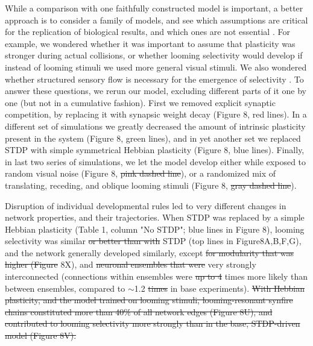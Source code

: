 \documentclass{article}
\providecommand{\DIFaddtex}[1]{{\protect\color{blue}{#1}}} %
\providecommand{\DIFdeltex}[1]{{\protect\color{red}\sout{#1}}}                      %
\providecommand{\DIFaddbegin}{} %
\providecommand{\DIFaddend}{} %
\providecommand{\DIFdelbegin}{} %
\providecommand{\DIFdelend}{} %
\providecommand{\DIFadd}[1]{\texorpdfstring{\DIFaddtex{#1}}{#1}} %
\providecommand{\DIFdel}[1]{\texorpdfstring{\DIFdeltex{#1}}{}} %
\newcommand{\DIFscaledelfig}{0.5}
\newlength{\DIFdelgraphicswidth} %
\newlength{\DIFdelgraphicsheight} %
\newcommand{\DIFaddincludegraphics}[2][]{{\color{blue}\fbox{\DIFOincludegraphics[#1]{#2}}}} %
\newcommand{\DIFdelincludegraphics}[2][]{%
\sbox{\DIFdelgraphicsbox}{\DIFOincludegraphics[#1]{#2}}%
\settoboxwidth{\DIFdelgraphicswidth}{\DIFdelgraphicsbox} %
\settoboxtotalheight{\DIFdelgraphicsheight}{\DIFdelgraphicsbox} %
\scalebox{\DIFscaledelfig}{%
\parbox[b]{\DIFdelgraphicswidth}{\usebox{\DIFdelgraphicsbox}\\[-\baselineskip] \rule{\DIFdelgraphicswidth}{0em}}\llap{\resizebox{\DIFdelgraphicswidth}{\DIFdelgraphicsheight}{%
\setlength{\unitlength}{\DIFdelgraphicswidth}%
\begin{picture}(1,1)%
\thicklines\linethickness{2pt} %
{\color[rgb]{1,0,0}\put(0,0){\framebox(1,1){}}}%
{\color[rgb]{1,0,0}\put(0,0){\line( 1,1){1}}}%
{\color[rgb]{1,0,0}\put(0,1){\line(1,-1){1}}}%
\end{picture}%
}\hspace*{3pt}}} %
} %
\DeclareRobustCommand{\DIFaddbegin}{\DIFOaddbegin \let\includegraphics\DIFaddincludegraphics} %
\DeclareRobustCommand{\DIFaddend}{\DIFOaddend \let\includegraphics\DIFOincludegraphics} %
\DeclareRobustCommand{\DIFdelbegin}{\DIFOdelbegin \let\includegraphics\DIFdelincludegraphics} %
\DeclareRobustCommand{\DIFdelend}{\DIFOaddend \let\includegraphics\DIFOincludegraphics} %
\begin{document}
While a comparison with one faithfully constructed model is important, a better approach is to consider a family of models, and see which assumptions are critical for the replication of biological results, and which ones are not essential \citep{linderman2017constrain, pauli2018repro}. For example, we wondered whether it was important to assume that plasticity was stronger during actual collisions, or whether looming selectivity would develop if instead of looming stimuli we used more general visual stimuli. We also wondered whether structured sensory flow is necessary for the emergence of selectivity \citep{triplett2018emergence}. To answer these questions, we rerun our model, excluding different parts of it one by one (but not in a cumulative fashion). First we removed explicit synaptic competition, by replacing it with synapsic weight decay (Figure 8, red lines). In a different set of simulations we greatly decreased the amount of intrinsic plasticity present in the system (Figure 8, \DIFaddbegin \DIFadd{dotted }\DIFaddend green lines), and in yet another set we replaced STDP with simple symmetrical Hebbian plasticity (Figure 8, blue lines). Finally, in last two series of simulations, we let the model develop either while exposed to random visual noise (Figure 8, \DIFdelbegin \DIFdel{pink dashed line}\DIFdelend \DIFaddbegin \DIFadd{dashed pink lines}\DIFaddend ), or a randomized mix of translating, receding, and oblique looming stimuli (Figure 8, \DIFdelbegin \DIFdel{gray dashed line}\DIFdelend \DIFaddbegin \DIFadd{dashed gray lines}\DIFaddend ).

Disruption of individual developmental rules led to very different changes in network properties, and their trajectories. When STDP was replaced by a simple Hebbian plasticity (Table 1, column "No STDP"; blue lines in Figure 8), looming selectivity was similar \DIFdelbegin \DIFdel{or better than with }\DIFdelend \DIFaddbegin \DIFadd{to that for }\DIFaddend STDP (top lines in Figure8A,B,F,G), and the network generally developed similarly, except \DIFdelbegin \DIFdel{for modularity that was higher (Figure }\DIFdelend \DIFaddbegin \DIFadd{that reciprocal connections were not eliminated (Figure 8T); connections were more local (Figure 8K) and modular (disjointed, Figure }\DIFaddend 8X), and \DIFdelbegin \DIFdel{neuronal ensembles that were }\DIFdelend \DIFaddbegin \DIFadd{with }\DIFaddend very strongly interconnected \DIFaddbegin \DIFadd{ensembles }\DIFaddend (connections within ensembles were \DIFdelbegin \DIFdel{up to 4 }\DIFdelend \DIFaddbegin \DIFadd{7 }\DIFaddend times more likely than between ensembles, compared to \DIFaddbegin \DIFadd{only }\DIFaddend $\sim$1.2 \DIFdelbegin \DIFdel{times }\DIFdelend \DIFaddbegin \DIFadd{probability ratio }\DIFaddend in base experiments).
\DIFdelbegin \DIFdel{With Hebbian plasticity, and the model trained on looming stimuli, looming-resonant synfire chains constituted more than 40\% of all network edges (Figure 8U), and contributed to looming selectivity more strongly than in the base, STDP-driven model (Figure 8V).
}\DIFdelend 
\end{document}
